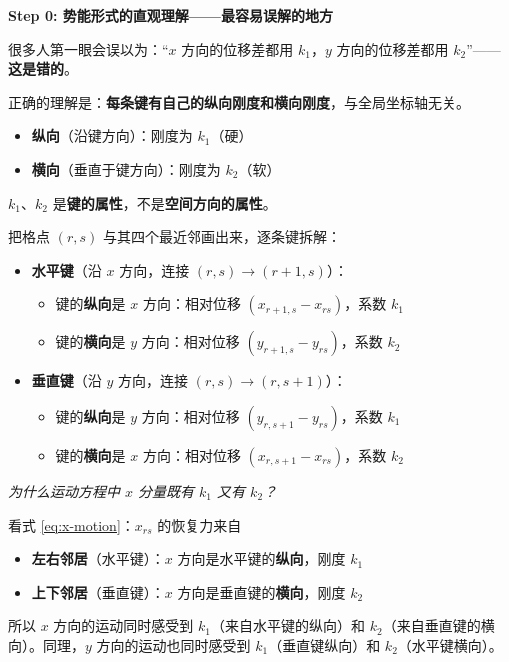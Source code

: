 \begin{derivationbox}[标准解题过程]
\textbf{Step 0: 势能形式的直观理解——最容易误解的地方}

\begin{warnbox}
很多人第一眼会误以为：``$x$ 方向的位移差都用 $k_1$，$y$ 方向的位移差都用 $k_2$''——\textbf{这是错的}。

正确的理解是：\textbf{每条键有自己的纵向刚度和横向刚度}，与全局坐标轴无关。
\begin{itemize}
    \item \textbf{纵向}（沿键方向）：刚度为 $k_1$（硬）
    \item \textbf{横向}（垂直于键方向）：刚度为 $k_2$（软）
\end{itemize}
$k_1$、$k_2$ 是\textbf{键的属性}，不是\textbf{空间方向的属性}。
\end{warnbox}

把格点 $(r,s)$ 与其四个最近邻画出来，逐条键拆解：
\begin{itemize}
    \item \textbf{水平键}（沿 $x$ 方向，连接 $(r,s)\to(r+1,s)$）：
    \begin{itemize}
        \item 键的\textbf{纵向}是 $x$ 方向：相对位移 $(x_{r+1,s}-x_{rs})$，系数 $k_1$
        \item 键的\textbf{横向}是 $y$ 方向：相对位移 $(y_{r+1,s}-y_{rs})$，系数 $k_2$
    \end{itemize}
    \item \textbf{垂直键}（沿 $y$ 方向，连接 $(r,s)\to(r,s+1)$）：
    \begin{itemize}
        \item 键的\textbf{纵向}是 $y$ 方向：相对位移 $(y_{r,s+1}-y_{rs})$，系数 $k_1$
        \item 键的\textbf{横向}是 $x$ 方向：相对位移 $(x_{r,s+1}-x_{rs})$，系数 $k_2$
    \end{itemize}
\end{itemize}

\textit{为什么运动方程中 $x$ 分量既有 $k_1$ 又有 $k_2$？}

看式 \eqref{eq:x-motion}：$x_{rs}$ 的恢复力来自
\begin{itemize}
    \item \textbf{左右邻居}（水平键）：$x$ 方向是水平键的\textbf{纵向}，刚度 $k_1$
    \item \textbf{上下邻居}（垂直键）：$x$ 方向是垂直键的\textbf{横向}，刚度 $k_2$
\end{itemize}
所以 $x$ 方向的运动同时感受到 $k_1$（来自水平键的纵向）和 $k_2$（来自垂直键的横向）。同理，$y$ 方向的运动也同时感受到 $k_1$（垂直键纵向）和 $k_2$（水平键横向）。


\end{derivationbox}
